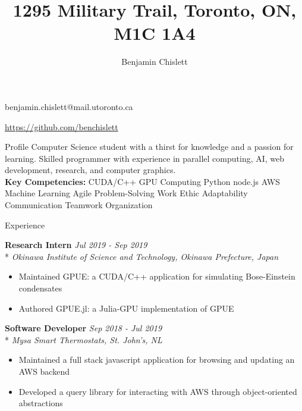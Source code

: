 \documentclass[11pt, letterpaper]{article}
\title{1295 Military Trail, Toronto, ON, M1C 1A4}
\author{Benjamin Chislett}
\date{}
\newcommand{\vbar}{\textbar\xspace}
\begin{document}
\begin{center}
  \Huge\theauthor
  \par
  \large\thetitle
  \par
  \large{benjamin.chislett@mail.utoronto.ca}
  \par
  \large\url{https://github.com/benchislett}
\end{center}

\begin{section}{Profile}
Computer Science student with a thirst for knowledge and a passion for learning.
Skilled programmer with experience in parallel computing, AI, web development, research, and computer graphics.
\\

\textbf{Key Competencies:} CUDA/C++ \vbar GPU Computing \vbar Python \vbar node.js \vbar AWS \vbar Machine Learning  Agile \vbar Problem-Solving \vbar Work Ethic \vbar Adaptability \vbar Communication \vbar Teamwork \vbar Organization

\end{section}

\begin{section}{Experience}

\textbf{Research Intern}
\hfill
\textit{Jul 2019 - Sep 2019}\\*
\textit{Okinawa Institute of Science and Technology, Okinawa Prefecture, Japan}

\begin{itemize}
  \item Maintained GPUE: a CUDA/C++ application for simulating Bose-Einstein condensates
  \item Authored GPUE.jl: a Julia-GPU implementation of GPUE\\
\end{itemize}

\textbf{Software Developer}
\hfill
\textit{Sep 2018 - Jul 2019}\\*
\textit{Mysa Smart Thermostats, St. John's, NL}
\begin{itemize}
  \item Maintained a full stack javascript application for browsing and updating an AWS backend
  \item Developed a query library for interacting with AWS through object-oriented abstractions
\end{itemize}

\end{section}
\end{document}
